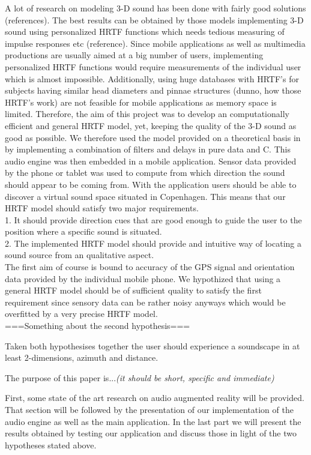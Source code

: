 \documentclass[journal]{IEEEtran}
\begin{document}
A lot of research on modeling 3-D sound has been done with fairly good solutions (references). The best results can be obtained by those models implementing 3-D sound using personalized HRTF functions which needs tedious measuring of impulse responses etc (reference). Since mobile applications as well as multimedia productions are usually aimed at a big number of users, implementing personalized HRTF functions would require measurements of the individual user which is almost impossible. Additionally, using huge databases with HRTF's for subjects having similar head diameters and pinnae structures (dunno, how those HRTF's work) are not feasible for mobile applications as memory space is limited. Therefore, the aim of this project was to develop an computationally efficient and general HRTF model, yet, keeping the quality of the 3-D sound as good as possible. We therefore used the model provided on a theoretical basis in \cite{Brown1998} by implementing a combination of filters and delays in pure data and C. This audio engine was then embedded in a mobile application. Sensor data provided by the phone or tablet was used to compute from which direction the sound should appear to be coming from. With the application users should be able to discover a virtual sound space situated in Copenhagen. This means that our HRTF model should satisfy two major requirements. 
\\1. It should provide direction cues that are good enough to guide the user to the position where a specific sound is situated.\\2. The implemented HRTF model should provide and intuitive way of locating a sound source from an qualitative aspect. \\The first aim of course is bound to accuracy of the GPS signal and orientation data provided by the individual mobile phone. We hypothized that using a general HRTF model should be of sufficient quality to satisfy the first requirement since sensory data can be rather noisy anyways which would be overfitted by a very precise HRTF model.\\ ===Something about the second hypothesis===

Taken both hypothesises together the user should experience a soundscape in at least 2-dimensions, azimuth and distance.

The purpose of this paper is...\textit{(it should be short, specific and immediate)}

First, some state of the art research on audio augmented reality will be provided. That section will be followed by the presentation of our implementation of the audio engine as well as the main application. In the last part we will present the results obtained by testing our application and discuss those in light of the two hypotheses stated above.
\end{document}

